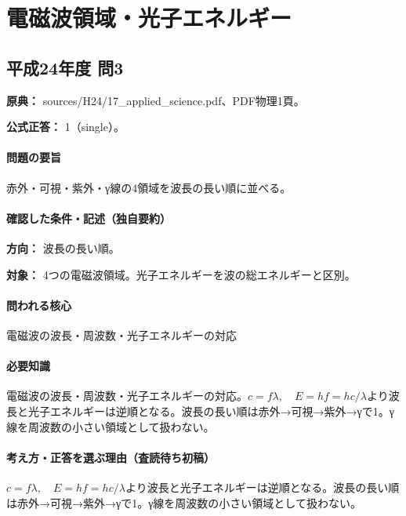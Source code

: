 \section{電磁波領域・光子エネルギー}

\subsection{平成24年度 問3}
\label{q:h24-reg-applied-03}

\noindent\textbf{原典：} sources/H24/17\_applied\_science.pdf、PDF物理1頁。

\textbf{公式正答：} 1（single）。

\paragraph{問題の要旨} 赤外・可視・紫外・γ線の4領域を波長の長い順に並べる。

\paragraph{確認した条件・記述（独自要約）}\mbox{}\par

\noindent\textbf{方向：} 波長の長い順。\par

\noindent\textbf{対象：} 4つの電磁波領域。光子エネルギーを波の総エネルギーと区別。\par

\paragraph{問われる核心} 電磁波の波長・周波数・光子エネルギーの対応

\paragraph{必要知識} 電磁波の波長・周波数・光子エネルギーの対応。\(c=f\lambda,\quad E=hf=hc/\lambda\)より波長と光子エネルギーは逆順となる。波長の長い順は赤外→可視→紫外→γで1。γ線を周波数の小さい領域として扱わない。

\paragraph{考え方・正答を選ぶ理由（査読待ち初稿）} \(c=f\lambda,\quad E=hf=hc/\lambda\)より波長と光子エネルギーは逆順となる。波長の長い順は赤外→可視→紫外→γで1。γ線を周波数の小さい領域として扱わない。


